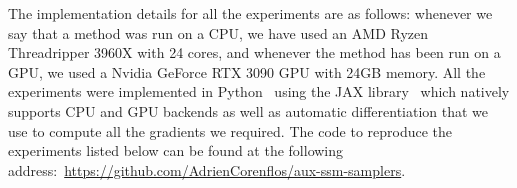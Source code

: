 The implementation details for all the experiments are as follows: whenever we say that a method was run on a CPU, we have used an AMD\textsuperscript{\textregistered} Ryzen Threadripper 3960X with 24 cores, and whenever the method has been run on a GPU, we used a Nvidia\textsuperscript{\textregistered} GeForce RTX 3090 GPU with 24GB memory. All the experiments were implemented in Python~\citep{Rossum2009Python} using the JAX library~\citep{jax2018github} which natively supports CPU and GPU backends as well as automatic differentiation that we use to compute all the gradients we required. The code to reproduce the experiments listed below can be found at the following address:~\url{https://github.com/AdrienCorenflos/aux-ssm-samplers}.

